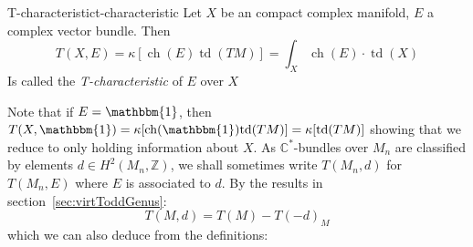 \documentclass{book}
\newcommand{\C}{{\mathbb{C}}}
\newcommand{\Z}{{\mathbb{Z}}}
\newcommand{\ch}{{\operatorname{ch}}}
\newcommand{\td}{{\operatorname{td}}}
\begin{document}
\begin{defn}{T-characteristic}{t-characteristic}
  Let $X$ be an compact complex manifold, $E$ a complex vector bundle. Then
  \[
    T(X, E) = \kappa[\ch(E)\td(TM)] = \int_X \ch(E)\cdot \td(X)
  \]
  Is called the \emph{T-characteristic} of $E$ over $X$
\end{defn}
Note that if $E = \mathbbm{1}$, then $T(X,\mathbbm{1}) = \kappa[\ch(\mathbbm{1})\td(TM)] = \kappa[\td(TM)]$
showing that we reduce to only holding information about $X$.
As $\C^*$-bundles over $M_n$ are classified by elements $d \in H^2(M_n, \Z)$, we shall sometimes write $T(M_n,
d)$ for $T(M_n, E)$ where $E$ is associated to $d$. By the results in section~\ref{sec:virtToddGenus}:
\[
  T(M, d) = T(M) - T(-d)_M
\]
which we can also deduce from the definitions:
\end{document}
